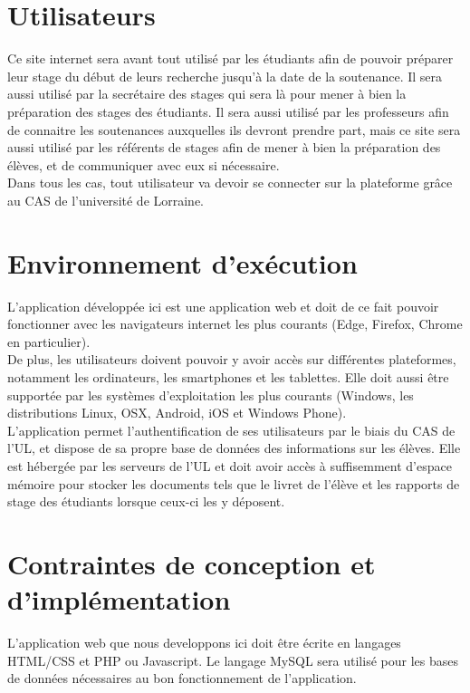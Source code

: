 \documentclass{scrreprt}
\begin{document}
\section{Utilisateurs}
\hspace{1cm}Ce site internet sera avant tout utilisé par les étudiants afin de pouvoir préparer leur stage du début de leurs recherche jusqu'à la date de la soutenance. Il sera aussi utilisé par la secrétaire des stages qui sera là pour mener à bien la préparation des stages des étudiants. Il sera aussi utilisé par les professeurs afin de connaitre les soutenances auxquelles ils devront prendre part, mais ce site sera aussi utilisé par les référents de stages afin de mener à bien la préparation des élèves, et de communiquer avec eux si nécessaire.\\

\hspace{0.6cm}Dans tous les cas, tout utilisateur va devoir se connecter sur la plateforme grâce au CAS de l'université de Lorraine.

\section{Environnement d'exécution}
\hspace{1cm}L'application développée ici est une application web et doit de ce fait pouvoir fonctionner avec les navigateurs internet les plus courants (Edge, Firefox, Chrome en particulier).\\

\hspace{0.6cm}De plus, les utilisateurs doivent pouvoir y avoir accès sur différentes plateformes, notamment les ordinateurs, les smartphones et les tablettes. Elle doit aussi être supportée par les systèmes d'exploitation les plus courants (Windows, les distributions Linux, OSX, Android, iOS et Windows Phone).\\

\hspace{0.6cm}L'application permet l'authentification de ses utilisateurs par le biais du CAS de l'UL, et dispose de sa propre base de données des informations sur les élèves. Elle est hébergée par les serveurs de l'UL et doit avoir accès à suffisemment d'espace mémoire pour stocker les documents tels que le livret de l'élève et les rapports de stage des étudiants lorsque ceux-ci les y déposent.


\section{Contraintes de conception et d'implémentation}
\hspace{1cm}L'application web que nous developpons ici doit être écrite en langages HTML/CSS et PHP ou Javascript. Le langage MySQL sera utilisé pour les bases de données nécessaires au bon fonctionnement de l'application.\\
\end{document}
